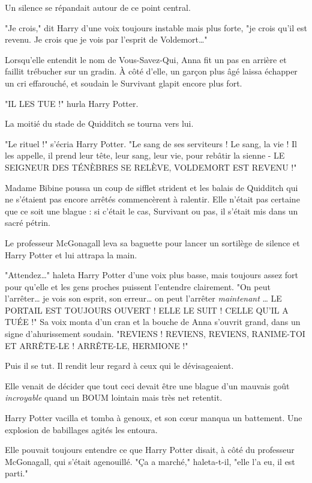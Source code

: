 Un silence se répandait autour de ce point central.

"Je crois," dit Harry d'une voix toujours instable mais plus forte, "je crois qu'il est revenu. Je crois que je vois par l'esprit de Voldemort…"

Lorsqu'elle entendit le nom de Vous-Savez-Qui, Anna fit un pas en arrière et faillit trébucher sur un gradin. À côté d'elle, un garçon plus âgé laissa échapper un cri effarouché, et soudain le Survivant glapit encore plus fort.

"IL LES TUE !" hurla Harry Potter.

La moitié du stade de Quidditch se tourna vers lui.

"Le rituel !" s'écria Harry Potter. "Le sang de ses serviteurs ! Le sang, la vie ! Il les appelle, il prend leur tête, leur sang, leur vie, pour rebâtir la sienne - LE SEIGNEUR DES TÉNÈBRES SE RELÈVE, VOLDEMORT EST REVENU !"

Madame Bibine poussa un coup de sifflet strident et les balais de Quidditch qui ne s'étaient pas encore arrêtés commencèrent à ralentir. Elle n'était pas certaine que ce soit une blague : si c'était le cas, Survivant ou pas, il s'était mis dans un sacré pétrin.

Le professeur McGonagall leva sa baguette pour lancer un sortilège de silence et Harry Potter et lui attrapa la main.

"Attendez…" haleta Harry Potter d'une voix plus basse, mais toujours assez fort pour qu'elle et les gens proches puissent l'entendre clairement. "On peut l'arrêter… je vois son esprit, son erreur… on peut l'arrêter \emph{maintenant}  … LE PORTAIL EST TOUJOURS OUVERT ! ELLE LE SUIT ! CELLE QU'IL A TUÉE !" Sa voix monta d'un cran et la bouche de Anna s'ouvrit grand, dans un signe d'ahurissement soudain. "REVIENS ! REVIENS, REVIENS, RANIME-TOI ET ARRÊTE-LE ! ARRÊTE-LE, HERMIONE !"

Puis il se tut. Il rendit leur regard à ceux qui le dévisageaient.

Elle venait de décider que tout ceci devait être une blague d'un mauvais goût \emph{incroyable}  quand un BOUM lointain mais très net retentit.

Harry Potter vacilla et tomba à genoux, et son cœur manqua un battement. Une explosion de babillages agités les entoura.

Elle pouvait toujours entendre ce que Harry Potter disait, à côté du professeur McGonagall, qui s'était agenouillé. "Ça a marché," haleta-t-il, "elle l'a eu, il est parti."

